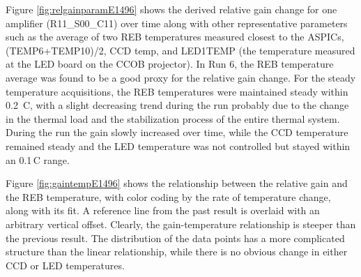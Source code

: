 Figure \ref{fig:relgainparamE1496} shows the derived
 relative gain change for one amplifier (R11\_S00\_C11) over time along with other representative parameters such as the average of two REB temperatures measured closest to the ASPICs, (TEMP6+TEMP10)/2, CCD temp, and LED1TEMP (the temperature measured at the LED board on the CCOB projector). In Run 6, the REB temperature average was found to be a good proxy for the relative gain change.
 For the steady temperature acquisitions, the REB temperatures were maintained steady within 0.2\, C, with a slight decreasing trend during the run probably due to the change in the thermal load and the stabilization process of the entire thermal system.
During the run the gain slowly increased over time, while the CCD temperature remained steady and the LED temperature was not controlled but stayed within an 0.1\,C range.

 Figure \ref{fig:gaintempE1496} shows the relationship between the relative gain and the REB temperature, with color coding by the rate of temperature change, along with its fit. A reference line from the past result is overlaid with an arbitrary vertical offset. Clearly, the gain-temperature relationship is steeper than the previous result. The distribution of the data points has a more complicated structure than the linear relationship, while there is no obvious change in either CCD or LED temperatures.



